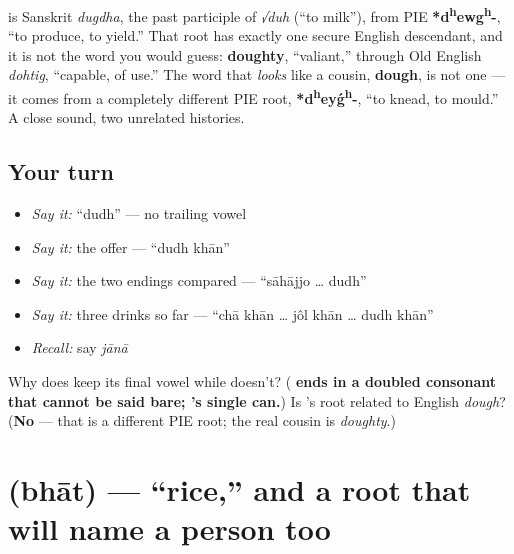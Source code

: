 \begin{cousinweb}
\textbf{} is Sanskrit \emph{dugdha}, the past participle of \emph{√duh} (\textquotedblleft{}to milk\textquotedblright{}), from PIE \textbf{*d\textsuperscript{h}ewg\textsuperscript{h}-}, \textquotedblleft{}to produce, to yield.\textquotedblright{} That root has exactly one secure English descendant, and it is not the word you would guess: \textbf{doughty}, \textquotedblleft{}valiant,\textquotedblright{} through Old English \emph{dohtig}, \textquotedblleft{}capable, of use.\textquotedblright{} The word that \emph{looks} like a cousin, \textbf{dough}, is not one — it comes from a completely different PIE root, \textbf{*d\textsuperscript{h}eyǵ\textsuperscript{h}-}, \textquotedblleft{}to knead, to mould.\textquotedblright{} A close sound, two unrelated histories.
\end{cousinweb}

\subsection*{Your turn}
\begin{itemize}
\raggedright
  \item \emph{Say it:} \textquotedblleft{}dudh\textquotedblright{} — no trailing vowel
  \item \emph{Say it:} the offer — \textquotedblleft{}dudh khān\textquotedblright{}
  \item \emph{Say it:} the two endings compared — \textquotedblleft{}sāhājjo … dudh\textquotedblright{}
  \item \emph{Say it:} three drinks so far — \textquotedblleft{}chā khān … jôl khān … dudh khān\textquotedblright{}
  \item \emph{Recall:} say \emph{jānā}
\end{itemize}

\begin{tcolorbox}[breakable,colback=teal!4,colframe=teal!35!black,title={Before you move on}]
Why does  keep its final vowel while  doesn't? (\textbf{ ends in a doubled consonant that cannot be said bare; 's single  can.}) Is 's root related to English \emph{dough}? (\textbf{No} — that is a different PIE root; the real cousin is \emph{doughty}.)
\end{tcolorbox}
\section[\texorpdfstring{\bn{ভাত} (bhāt)}{ভাত (bhāt)}]{ (bhāt) — \textquotedblleft{}rice,\textquotedblright{} and a root that will name a person too}

